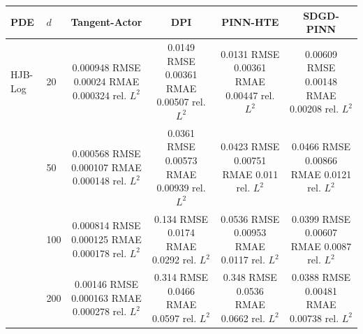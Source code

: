 \begin{tabular}{llcccc}
\toprule
PDE & $d$ & Tangent-Actor & DPI & PINN-HTE & SDGD-PINN \\
\midrule
HJB-Log & 20 & \shortstack{0.000948 RMSE\\0.00024 RMAE\\0.000324 rel. $L^2$} & \shortstack{0.0149 RMSE\\0.00361 RMAE\\0.00507 rel. $L^2$} & \shortstack{0.0131 RMSE\\0.00361 RMAE\\0.00447 rel. $L^2$} & \shortstack{0.00609 RMSE\\0.00148 RMAE\\0.00208 rel. $L^2$} \\
 & 50 & \shortstack{0.000568 RMSE\\0.000107 RMAE\\0.000148 rel. $L^2$} & \shortstack{0.0361 RMSE\\0.00573 RMAE\\0.00939 rel. $L^2$} & \shortstack{0.0423 RMSE\\0.00751 RMAE\\0.011 rel. $L^2$} & \shortstack{0.0466 RMSE\\0.00866 RMAE\\0.0121 rel. $L^2$} \\
 & 100 & \shortstack{0.000814 RMSE\\0.000125 RMAE\\0.000178 rel. $L^2$} & \shortstack{0.134 RMSE\\0.0174 RMAE\\0.0292 rel. $L^2$} & \shortstack{0.0536 RMSE\\0.00953 RMAE\\0.0117 rel. $L^2$} & \shortstack{0.0399 RMSE\\0.00607 RMAE\\0.0087 rel. $L^2$} \\
 & 200 & \shortstack{0.00146 RMSE\\0.000163 RMAE\\0.000278 rel. $L^2$} & \shortstack{0.314 RMSE\\0.0466 RMAE\\0.0597 rel. $L^2$} & \shortstack{0.348 RMSE\\0.0536 RMAE\\0.0662 rel. $L^2$} & \shortstack{0.0388 RMSE\\0.00481 RMAE\\0.00738 rel. $L^2$} \\

\end{tabular}
